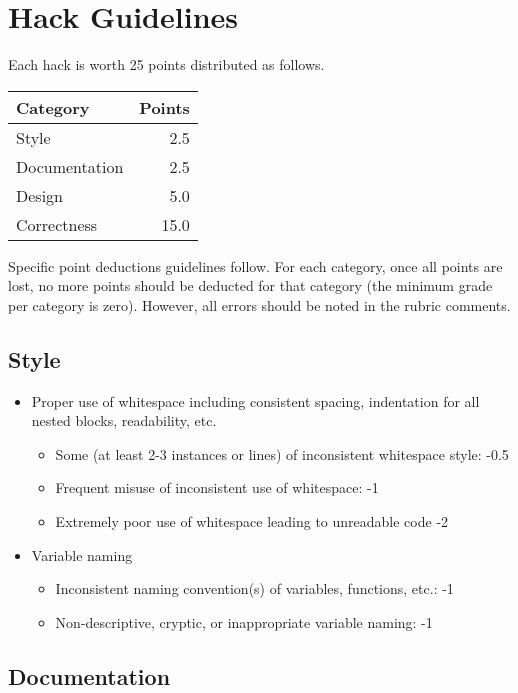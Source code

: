 \documentclass[12pt]{scrartcl}
\begin{document}
\newpage

\section*{Hack Guidelines}

Each hack is worth 25 points distributed as follows.
\begin{table}[h]
\centering
\begin{tabular}{|l|r|}
\hline
Category & Points \\
\hline
Style & 2.5 \\
\hline
Documentation & 2.5 \\
\hline
Design & 5.0 \\
\hline
Correctness & 15.0 \\
\hline
\end{tabular}
\end{table}
Specific point deductions guidelines follow.  For each category, once all 
points are lost, no more points should be deducted for that category (the
minimum grade per category is zero).  However, all errors should be noted 
in the rubric comments.

\subsection*{Style}

\begin{itemize}
  \item Proper use of whitespace including consistent spacing, indentation for all nested blocks, readability, etc.
  \begin{itemize}
    \item Some (at least 2-3 instances or lines) of inconsistent whitespace style: -0.5
    \item Frequent misuse of inconsistent use of whitespace: -1 
    \item Extremely poor use of whitespace leading to unreadable code -2
  \end{itemize}
  \item Variable naming
  \begin{itemize}
    \item Inconsistent naming convention(s) of variables, functions, etc.: -1
    \item Non-descriptive, cryptic, or inappropriate variable naming: -1
  \end{itemize}
\end{itemize}

\subsection*{Documentation}
\end{document}
